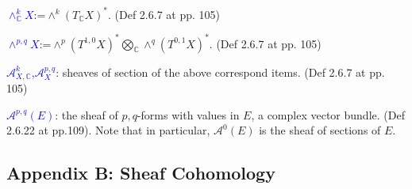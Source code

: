 \documentclass{article}
\numberwithin{equation}{subsection} %
\begin{document}
		\textcolor{blue}{$\wedge^k_{\mathbb{C}}X$}:=$\wedge^k(T_{\mathbb{C}}X)^*$. (Def 2.6.7 at pp. 105)
		
		\textcolor{blue}{$\wedge^{p,q}X$}:=$\wedge^p(T^{1,0}X)^*
							\bigotimes_{\mathbb{C}}\wedge^q(T^{0,1}X)^*$. (Def 2.6.7 at pp. 105)
	
		\textcolor{blue}{$\mathcal{A}^k_{X,\mathbb{C}}$,$\mathcal{A}^{p,q}_X$}: sheaves of section of the above correspond items. (Def 2.6.7 at pp. 105)
		
		\textcolor{blue}{$\mathcal{A}^{p,q}(E)$}: the sheaf of $p,q$-forms with values in $E$, a complex vector bundle. (Def 2.6.22 at pp.109). Note that in particular, $\mathcal{A}^0(E)$ is the sheaf of sections of $E$.

	\subsection{Appendix B: Sheaf Cohomology}
	
\end{document}
